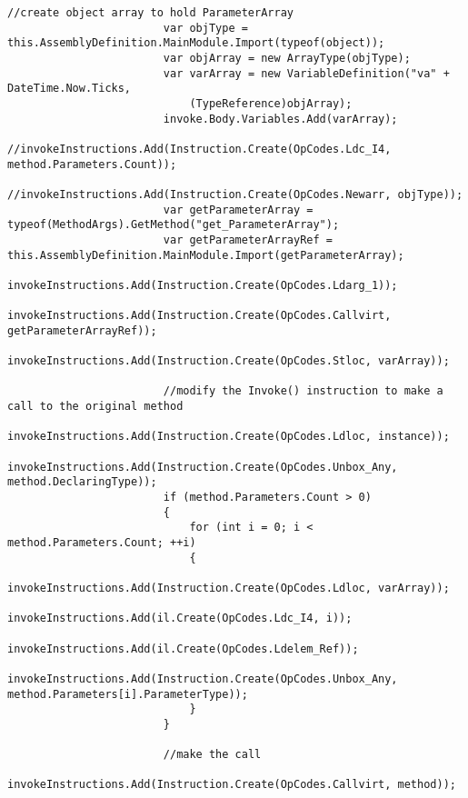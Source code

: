 \begin{lstlisting}[caption={../buffalo/Injectors/MethodAroundInjector.cs}, label=../buffalo/Injectors/MethodAroundInjector.cs, frame=tb, basicstyle=\scriptsize]
                        //create object array to hold ParameterArray
                        var objType = this.AssemblyDefinition.MainModule.Import(typeof(object));
                        var objArray = new ArrayType(objType);
                        var varArray = new VariableDefinition("va" + DateTime.Now.Ticks,
                            (TypeReference)objArray);
                        invoke.Body.Variables.Add(varArray);
                        //invokeInstructions.Add(Instruction.Create(OpCodes.Ldc_I4, method.Parameters.Count));
                        //invokeInstructions.Add(Instruction.Create(OpCodes.Newarr, objType));
                        var getParameterArray = typeof(MethodArgs).GetMethod("get_ParameterArray");
                        var getParameterArrayRef = this.AssemblyDefinition.MainModule.Import(getParameterArray);
                        invokeInstructions.Add(Instruction.Create(OpCodes.Ldarg_1));
                        invokeInstructions.Add(Instruction.Create(OpCodes.Callvirt, getParameterArrayRef));
                        invokeInstructions.Add(Instruction.Create(OpCodes.Stloc, varArray));

                        //modify the Invoke() instruction to make a call to the original method
                        invokeInstructions.Add(Instruction.Create(OpCodes.Ldloc, instance));
                        invokeInstructions.Add(Instruction.Create(OpCodes.Unbox_Any, method.DeclaringType));
                        if (method.Parameters.Count > 0)
                        {
                            for (int i = 0; i < method.Parameters.Count; ++i)
                            {
                                invokeInstructions.Add(Instruction.Create(OpCodes.Ldloc, varArray));
                                invokeInstructions.Add(il.Create(OpCodes.Ldc_I4, i));
                                invokeInstructions.Add(il.Create(OpCodes.Ldelem_Ref));
                                invokeInstructions.Add(Instruction.Create(OpCodes.Unbox_Any, method.Parameters[i].ParameterType));
                            }
                        }

                        //make the call
                        invokeInstructions.Add(Instruction.Create(OpCodes.Callvirt, method));


\end{lstlisting}
